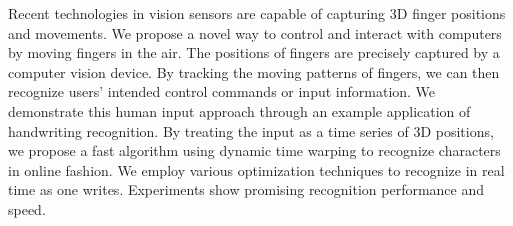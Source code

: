 Recent technologies in vision sensors are capable of capturing 3D finger positions and movements.
We propose a novel way to control and interact with computers by moving fingers in the air. The positions of fingers are precisely captured by a computer vision device. By tracking the moving patterns of fingers, we can then recognize users' intended control commands or input information.  We demonstrate this human input approach through an example application of handwriting recognition.
By treating the input as a time series of 3D positions, we propose a fast algorithm using dynamic time warping to recognize characters in online fashion. We employ various optimization techniques to recognize in real time as one writes. Experiments show promising recognition performance and speed.  
